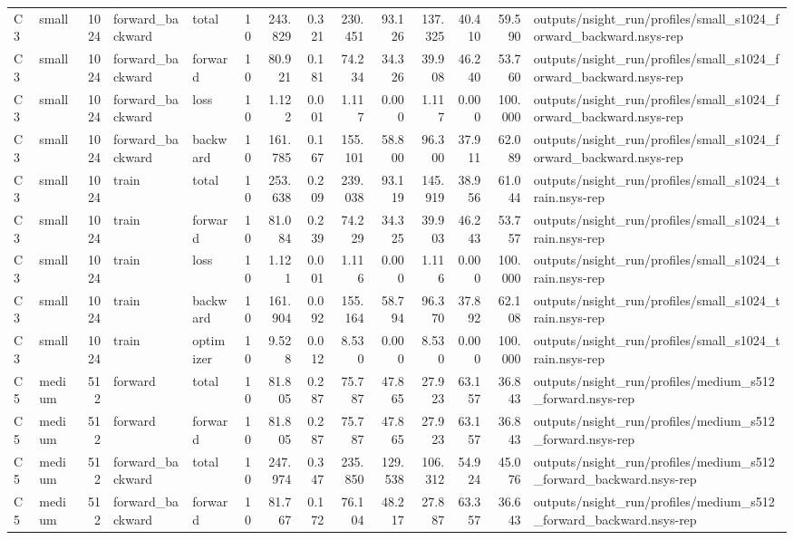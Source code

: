 \begin{tabular}{llrllrrrrrrrrl}
C3 & small & 1024 & forward\_backward & total & 10 & 243.829 & 0.321 & 230.451 & 93.126 & 137.325 & 40.410 & 59.590 & outputs/nsight\_run/profiles/small\_s1024\_forward\_backward.nsys-rep \\
C3 & small & 1024 & forward\_backward & forward & 10 & 80.921 & 0.181 & 74.234 & 34.326 & 39.908 & 46.240 & 53.760 & outputs/nsight\_run/profiles/small\_s1024\_forward\_backward.nsys-rep \\
C3 & small & 1024 & forward\_backward & loss & 10 & 1.122 & 0.001 & 1.117 & 0.000 & 1.117 & 0.000 & 100.000 & outputs/nsight\_run/profiles/small\_s1024\_forward\_backward.nsys-rep \\
C3 & small & 1024 & forward\_backward & backward & 10 & 161.785 & 0.167 & 155.101 & 58.800 & 96.300 & 37.911 & 62.089 & outputs/nsight\_run/profiles/small\_s1024\_forward\_backward.nsys-rep \\
C3 & small & 1024 & train & total & 10 & 253.638 & 0.209 & 239.038 & 93.119 & 145.919 & 38.956 & 61.044 & outputs/nsight\_run/profiles/small\_s1024\_train.nsys-rep \\
C3 & small & 1024 & train & forward & 10 & 81.084 & 0.239 & 74.229 & 34.325 & 39.903 & 46.243 & 53.757 & outputs/nsight\_run/profiles/small\_s1024\_train.nsys-rep \\
C3 & small & 1024 & train & loss & 10 & 1.121 & 0.001 & 1.116 & 0.000 & 1.116 & 0.000 & 100.000 & outputs/nsight\_run/profiles/small\_s1024\_train.nsys-rep \\
C3 & small & 1024 & train & backward & 10 & 161.904 & 0.092 & 155.164 & 58.794 & 96.370 & 37.892 & 62.108 & outputs/nsight\_run/profiles/small\_s1024\_train.nsys-rep \\
C3 & small & 1024 & train & optimizer & 10 & 9.528 & 0.012 & 8.530 & 0.000 & 8.530 & 0.000 & 100.000 & outputs/nsight\_run/profiles/small\_s1024\_train.nsys-rep \\
C5 & medium & 512 & forward & total & 10 & 81.805 & 0.287 & 75.787 & 47.865 & 27.923 & 63.157 & 36.843 & outputs/nsight\_run/profiles/medium\_s512\_forward.nsys-rep \\
C5 & medium & 512 & forward & forward & 10 & 81.805 & 0.287 & 75.787 & 47.865 & 27.923 & 63.157 & 36.843 & outputs/nsight\_run/profiles/medium\_s512\_forward.nsys-rep \\
C5 & medium & 512 & forward\_backward & total & 10 & 247.974 & 0.347 & 235.850 & 129.538 & 106.312 & 54.924 & 45.076 & outputs/nsight\_run/profiles/medium\_s512\_forward\_backward.nsys-rep \\
C5 & medium & 512 & forward\_backward & forward & 10 & 81.767 & 0.172 & 76.104 & 48.217 & 27.887 & 63.357 & 36.643 & outputs/nsight\_run/profiles/medium\_s512\_forward\_backward.nsys-rep \\

\end{tabular}
